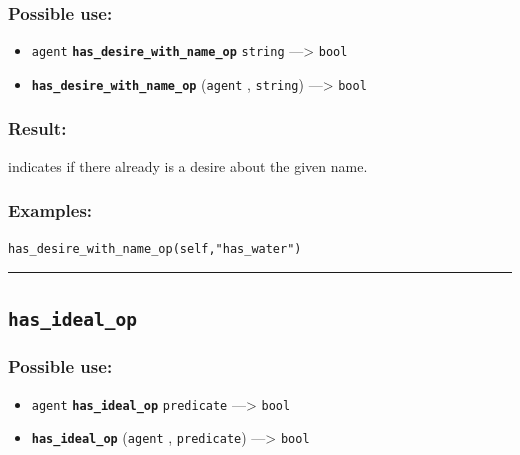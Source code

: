 \documentclass[]{book}
\providecommand{\tightlist}{%
  \setlength{\itemsep}{0pt}\setlength{\parskip}{0pt}}
\theoremstyle{definition}
\theoremstyle{definition}
\theoremstyle{definition}
\theoremstyle{remark}
\begin{document}
\subsubsection{Possible use:}\label{possible-use-249}

\begin{itemize}
\tightlist
\item
  \texttt{agent} \textbf{\texttt{has\_desire\_with\_name\_op}}
  \texttt{string} ---\textgreater{} \texttt{bool}
\item
  \textbf{\texttt{has\_desire\_with\_name\_op}} (\texttt{agent} ,
  \texttt{string}) ---\textgreater{} \texttt{bool}
\end{itemize}

\subsubsection{Result:}\label{result-240}

indicates if there already is a desire about the given name.

\subsubsection{Examples:}\label{examples-189}

\begin{verbatim}
has_desire_with_name_op(self,"has_water") 
\end{verbatim}

\begin{center}\rule{0.5\linewidth}{\linethickness}\end{center}

\subsection{\texorpdfstring{\texttt{has\_ideal\_op}}{has\_ideal\_op}}\label{has_ideal_op}

\subsubsection{Possible use:}\label{possible-use-250}

\begin{itemize}
\tightlist
\item
  \texttt{agent} \textbf{\texttt{has\_ideal\_op}} \texttt{predicate}
  ---\textgreater{} \texttt{bool}
\item
  \textbf{\texttt{has\_ideal\_op}} (\texttt{agent} , \texttt{predicate})
  ---\textgreater{} \texttt{bool}
\end{itemize}
\end{document}
